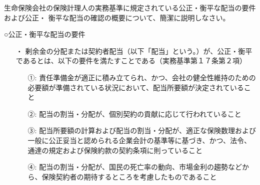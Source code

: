 \documentclass[report,gutter=10mm,fore-edge=10mm,uplatex,dvipdfmx]{jlreq}
\begin{document}

生命保険会社の保険計理人の実務基準に規定されている公正・衡平な配当の要件および公正・
衡平な配当の確認の概要について、簡潔に説明しなさい。

\answer{}
○公正・衡平な配当の要件

\begin{itemize}
\item[・] 剰余金の分配または契約者配当（以下「配当」という。）が、公正・衡平であるとは、以下の要件を満たすことである（実務基準第１７条第２項）
\begin{itemize}
\item[①: ] 責任準備金が適正に積み立てられ、かつ、会社の健全性維持のための必要額が準備されている状況において、配当所要額が決定されていること
\item[②: ] 配当の割当・分配が、個別契約の貢献に応じて行われていること
\item[③: ] 配当所要額の計算および配当の割当・分配が、適正な保険数理および一般に公正妥当と認められる企業会計の基準等に基づき、かつ、法令、通達の規定および保険約款の契約条項に則っていること
\item[④: ] 配当の割当・分配が、国民の死亡率の動向、市場金利の趨勢などから、保険契約者の期待するところを考慮したものであること
\end{itemize}
\end{itemize}
\end{document}
